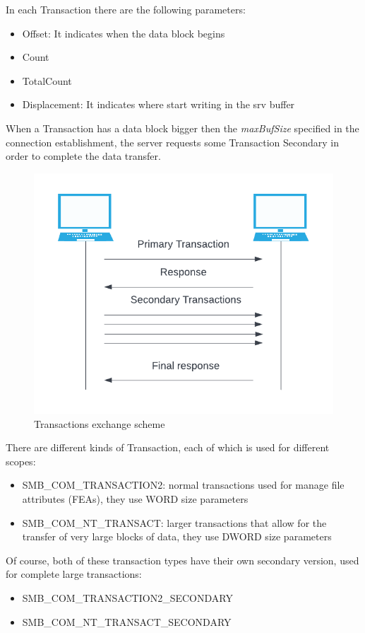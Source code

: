 In each Transaction there are the following parameters\cite{microsoft-transactions}:
\begin{itemize}
    \item Offset: It indicates when the data block begins
    \item Count
    \item TotalCount
    \item Displacement: It indicates where start writing in the srv buffer
\end{itemize}
\clearpage
\noindent When a Transaction has a data block bigger then the \textit{maxBufSize} specified in the connection establishment, the server requests some Transaction Secondary in order
to complete the data transfer\cite{microsoft-transactions}.\\
\begin{figure}[ht!]
    \centering
      \includegraphics[]{images/transactions_scheme.png}
      \caption{Transactions exchange scheme}
\end{figure}

\noindent There are different kinds of Transaction, each of which is used for different scopes:
\begin{itemize}
    \item SMB\_COM\_TRANSACTION2: normal transactions used for manage file attributes (FEAs), they use WORD size parameters
    \item SMB\_COM\_NT\_TRANSACT: larger transactions that allow for the transfer of very large blocks of data,
    they use DWORD size parameters
\end{itemize}
Of course, both of these transaction types have their own secondary version, used for complete large transactions:
\begin{itemize}
    \item SMB\_COM\_TRANSACTION2\_SECONDARY
    \item SMB\_COM\_NT\_TRANSACT\_SECONDARY
\end{itemize}